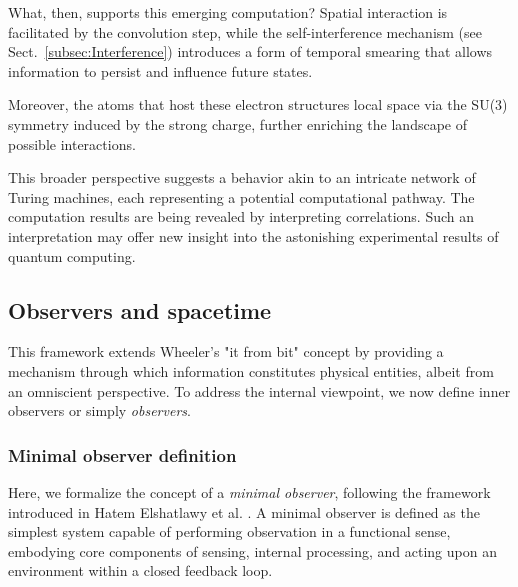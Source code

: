 \documentclass{ijuc}
\begin{document}
What, then, supports this emerging computation? 
Spatial interaction is facilitated by the convolution step, while the self-interference mechanism (see Sect.~\ref{subsec:Interference}) introduces a form of temporal smearing that allows information to persist and influence future states.

Moreover, the atoms that host these electron structures local space via the SU(3) symmetry induced by the strong charge, further enriching the landscape of possible interactions.

This broader perspective suggests a behavior akin to an intricate network of Turing machines, each representing a potential computational pathway. 
The computation results are being revealed by interpreting correlations. 
Such an interpretation may offer new insight into the astonishing experimental results of quantum computing.

\subsection{Observers and spacetime}  

This framework extends Wheeler's "it from bit" concept by providing a mechanism through which information constitutes physical entities, albeit from an omniscient perspective. 
To address the internal viewpoint, we now define inner observers or simply \textit{observers}. 

\subsubsection{Minimal observer definition}

Here, we formalize the concept of a \emph{minimal observer}, following the framework introduced in Hatem Elshatlawy et al. \cite{elshatlawy2025towards}. 
A minimal observer is defined as the simplest system capable of performing observation in a functional sense, embodying core components of sensing, internal processing, and acting upon an environment within a closed feedback loop.
\end{document}
